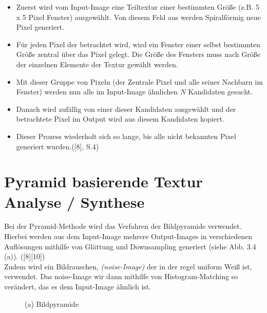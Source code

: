 \documentclass[12pt]{report}
\begin{document}
\begin{itemize}
    \item Zuerst wird vom Input-Image eine Teiltextur einer bestimmten Größe {(z.B. 5 x 5 Pixel Fenster)} ausgewählt. Von diesem Feld aus werden Spiralförmig neue Pixel generiert.
    \item Für jeden Pixel der betrachtet wird, wird ein Fenster einer selbst bestimmten Größe zentral über das Pixel gelegt.
    Die Größe des Fensters muss nach Größe der einzelnen Elemente der Textur gewählt werden.
    \item Mit dieser Gruppe von Pixeln {(der Zentrale Pixel und alle seiner Nachbarn im Fenster)} werden nun alle im Input-Image ähnlichen $N$ Kandidaten gesucht.
    \item Danach wird zufällig von einer dieser Kandidaten ausgewählt und der betrachtete Pixel im Output wird aus diesem Kandidaten kopiert.
    \item Dieser Prozess wiederholt sich so lange, bis alle nicht bekannten Pixel generiert wurden.{([8], S.4)}
\end{itemize}

\section{Pyramid basierende Textur Analyse / Synthese}

Bei der Pyramid-Methode wird das Verfahren der Bildpyramide verwendet.
Hierbei werden aus dem Input-Image mehrere Output-Images in verschiedenen Auflösungen mithilfe von Glättung und Downsampling generiert {(siehe Abb. 3.4 (a))}. {([8][10])}\\
Zudem wird ein Bildrauschen, \textit{(noise-Image)} der in der regel uniform Weiß ist, verwendet.
Das noise-Image wir dann mithilfe von Histogram-Matching so verändert, das es dem Input-Image ähnlich ist.

\begin{figure}[H]
    \centering
    \caption{(a) Bildpyramide}%
\end{figure}
\end{document}
